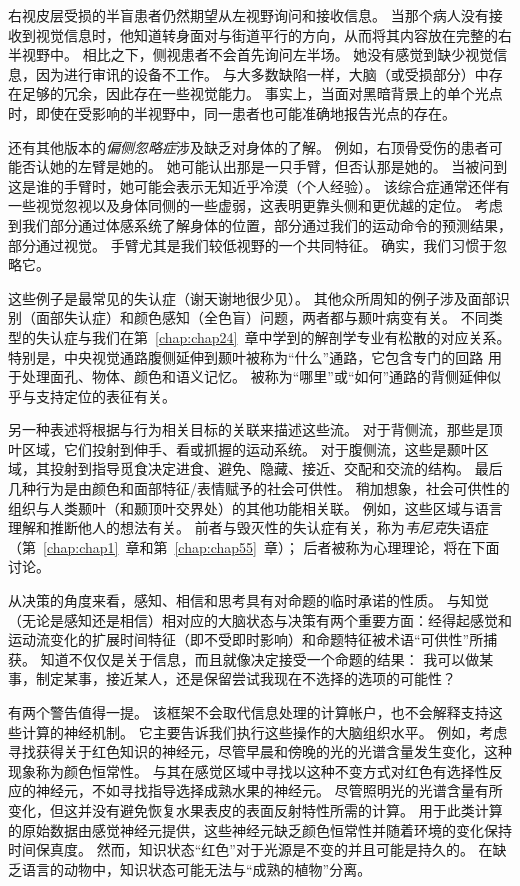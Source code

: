 右视皮层受损的半盲患者仍然期望从左视野询问和接收信息。
当那个病人没有接收到视觉信息时，他知道转身面对与街道平行的方向，从而将其内容放在完整的右半视野中。
相比之下，侧视患者不会首先询问左半场。
她没有感觉到缺少视觉信息，因为进行审讯的设备不工作。
与大多数缺陷一样，大脑（或受损部分）中存在足够的冗余，因此存在一些视觉能力。
事实上，当面对黑暗背景上的单个光点时，即使在受影响的半视野中，同一患者也可能准确地报告光点的存在。


还有其他版本的\textit{偏侧忽略症}涉及缺乏对身体的了解。
例如，右顶骨受伤的患者可能否认她的左臂是她的。
她可能认出那是一只手臂，但否认那是她的。
当被问到这是谁的手臂时，她可能会表示无知近乎冷漠（个人经验）。
该综合症通常还伴有一些视觉忽视以及身体同侧的一些虚弱，这表明更靠头侧和更优越的定位。
考虑到我们部分通过体感系统了解身体的位置，部分通过我们的运动命令的预测结果，部分通过视觉。
手臂尤其是我们较低视野的一个共同特征。
确实，我们习惯于忽略它。


这些例子是最常见的失认症（谢天谢地很少见）。
其他众所周知的例子涉及面部识别（面部失认症）和颜色感知（全色盲）问题，两者都与颞叶病变有关。
不同类型的失认症与我们在第~\ref{chap:chap24}~章中学到的解剖学专业有松散的对应关系。
特别是，中央视觉通路腹侧延伸到颞叶被称为“什么”通路，它包含专门的回路 用于处理面孔、物体、颜色和语义记忆。
被称为“哪里”或“如何”通路的背侧延伸似乎与支持定位的表征有关。


另一种表述将根据与行为相关目标的关联来描述这些流。
对于背侧流，那些是顶叶区域，它们投射到伸手、看或抓握的运动系统。
对于腹侧流，这些是颞叶区域，其投射到指导觅食决定进食、避免、隐藏、接近、交配和交流的结构。
最后几种行为是由颜色和面部特征/表情赋予的社会可供性。
稍加想象，社会可供性的组织与人类颞叶（和颞顶叶交界处）的其他功能相关联。
例如，这些区域与语言理解和推断他人的想法有关。
前者与毁灭性的失认症有关，称为\textit{韦尼克}失语症（第~\ref{chap:chap1}~章和第~\ref{chap:chap55}~章）；
后者被称为心理理论，将在下面讨论。


从决策的角度来看，感知、相信和思考具有对命题的临时承诺的性质。
与知觉（无论是感知还是相信）相对应的大脑状态与决策有两个重要方面：经得起感觉和运动流变化的扩展时间特征（即不受即时影响）和命题特征被术语“可供性”所捕获。
知道不仅仅是关于信息，而且就像决定接受一个命题的结果：
我可以做某事，制定某事，接近某人，还是保留尝试我现在不选择的选项的可能性？


有两个警告值得一提。
该框架不会取代信息处理的计算帐户，也不会解释支持这些计算的神经机制。
它主要告诉我们执行这些操作的大脑组织水平。
例如，考虑寻找获得关于红色知识的神经元，尽管早晨和傍晚的光的光谱含量发生变化，这种现象称为颜色恒常性。
与其在感觉区域中寻找以这种不变方式对红色有选择性反应的神经元，不如寻找指导选择成熟水果的神经元。
尽管照明光的光谱含量有所变化，但这并没有避免恢复水果表皮的表面反射特性所需的计算。
用于此类计算的原始数据由感觉神经元提供，这些神经元缺乏颜色恒常性并随着环境的变化保持时间保真度。
然而，知识状态“红色”对于光源是不变的并且可能是持久的。
在缺乏语言的动物中，知识状态可能无法与“成熟的植物”分离。


